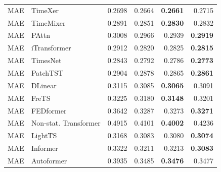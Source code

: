 \begin{longtable}{llrrrr}
MAE & TimeXer & 0.2698 & 0.2664 & \textbf{0.2661} & 0.2715 \\
MAE & TimeMixer & 0.2891 & 0.2851 & \textbf{0.2830} & 0.2832 \\
MAE & PAttn & 0.3008 & 0.2966 & 0.2939 & \textbf{0.2919} \\
MAE & iTransformer & 0.2912 & 0.2820 & 0.2825 & \textbf{0.2815} \\
MAE & TimesNet & 0.2843 & 0.2792 & 0.2786 & \textbf{0.2773} \\
MAE & PatchTST & 0.2904 & 0.2878 & 0.2865 & \textbf{0.2861} \\
MAE & DLinear & 0.3115 & 0.3085 & \textbf{0.3065} & 0.3091 \\
MAE & FreTS & 0.3225 & 0.3180 & \textbf{0.3148} & 0.3201 \\
MAE & FEDformer & 0.3642 & 0.3287 & 0.3273 & \textbf{0.3271} \\
MAE & Non-stat. Transformer & 0.4915 & 0.4101 & \textbf{0.4002} & 0.4236 \\
MAE & LightTS & 0.3168 & 0.3083 & 0.3080 & \textbf{0.3074} \\
MAE & Informer & 0.3322 & 0.3211 & 0.3213 & \textbf{0.3083} \\
MAE & Autoformer & 0.3935 & 0.3485 & \textbf{0.3476} & 0.3477 \\
\end{longtable}
\endgroup

